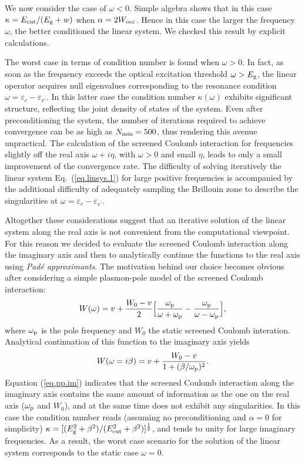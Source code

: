 \documentclass[twocolumn,prb,showpacs,superscriptaddress]{revtex4}
\def\w{\omega}
\def\E{\varepsilon}
\def\vp{{v^\prime}}
\begin{document}
We now consider the case of $\w<0$. Simple algebra shows that in this case
$\kappa = E_{\rm cut}/(E_{\rm g} + w)$
when $\alpha = 2W_{\rm occ}$. Hence in this case the larger the frequency $\w$,
the better conditioned the linear system. We checked this result
by explicit calculations.

The worst case in terms of condition number is found when $\w>0$. 
In fact, as soon as the frequency exceeds the optical excitation
threshold $\w>E_{\rm g}$, the linear operator acquires null eigenvalues 
corresponding to the resonance condition $\w = \E_c - \E_\vp$. 
In this latter case the condition
number $\kappa(\w)$ exhibits significant structure, reflecting
the joint density of states of the system. Even after preconditioning the system, 
the number of iterations required to achieve convergence can be as high as 
$N_{\rm min} = 500$, thus rendering this avenue unpractical.
The calculation of the screened Coulomb interaction for frequencies slightly
off the real axis $\w+i\eta$, with $\w>0$ and small $\eta$, leads to only a small
improvement of the convergence rate.
The difficulty of solving iteratively the linear system Eq.\ (\ref{eq.linsys.1})
for large positive frequencies is accompanied by the additional difficulty 
of adequately sampling the Brillouin zone to describe the singularities at $\w = \E_c - \E_\vp$.

Altogether these considerations suggest that an iterative solution of the
linear system along the real axis is not convenient from the computational
viewpoint. For this reason we decided to evaluate the screened Coulomb interaction 
along the imaginary axis and then to analytically continue the functions
to the real axis using {\it Pad\'e approximants}.\cite{pade1,pade2,blochl}
The motivation behind our choice becomes obvious after considering a simple
plasmon-pole model of the screened Coulomb interaction:\cite{hl86}
  \begin{equation}
  W(\w) = v + \frac{W_0 -v}{2} \Big[ \frac{\w_{\rm p}}{\w+\w_{\rm p}} - \frac{\w_{\rm p}}{\w-\w_{\rm p}} \Big],
  \end{equation}
where $\w_{\rm p}$ is the pole frequency and $W_0$ the static screened Coulomb interation.
Analytical continuation of this function to the imaginary axis yields
  \begin{equation} \label{eq.pp.im}
  W(\w=i\beta) = v + \frac{W_0 -v}{1+(\beta/\w_{\rm p})^2}.
  \end{equation}
Equation (\ref{eq.pp.im}) indicates that the screened Coulomb interaction along the imaginary axis contains the same
amount of information as the one on the real axis ($\w_{\rm p}$ and $W_0$), and at the same time
does not exhibit any singularities. In this case the condition number reads
(assuming no preconditioning and $\alpha=0$ for simplicity) 
$\kappa=[(E_{\rm g}^2+\beta^2)/(E_{\rm cut}^2+\beta^2)]^\frac{1}{2}$,
and tends to unity for large imaginary frequencies.
As a result, the worst case scenario for the solution 
of the linear system corresponds to the static case $\w=0$.
\end{document}
